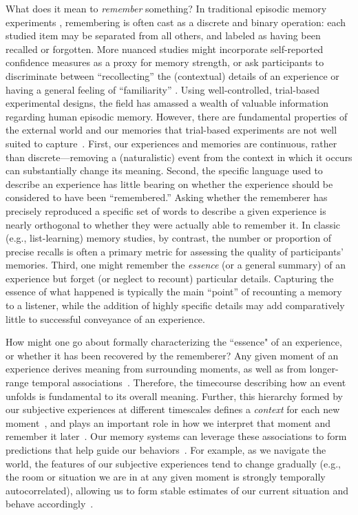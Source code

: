 \documentclass{article}
\begin{document}
What does it mean to \textit{remember} something? In traditional episodic memory experiments \citep[e.g., list-learning or trial-based experiments;][]{Murd62a, Kaha96}, remembering is often cast as a discrete and binary operation: each studied item may be separated from all others, and labeled as having been recalled or forgotten. More nuanced studies might incorporate self-reported confidence measures as a proxy for memory strength, or ask participants to discriminate between ``recollecting'' the (contextual) details of an experience or having a general feeling of ``familiarity'' \citep{Yone02}. Using well-controlled, trial-based experimental designs, the field has amassed a wealth of valuable information regarding human episodic memory.  However, there are fundamental properties of the external world and our memories that trial-based experiments are not well suited to capture~\citep[for review also see][]{KoriGold94, HukEtal18}.  First, our experiences and memories are continuous, rather than discrete---removing a (naturalistic) event from the context in which it occurs can substantially change its meaning.  Second, the specific language used to describe an experience has little bearing on whether the experience should be considered to have been ``remembered.''  Asking whether the rememberer has precisely reproduced a specific set of words to describe a given experience is nearly orthogonal to whether they were actually able to remember it.  In classic (e.g., list-learning) memory studies, by contrast, the number or proportion of precise recalls is often a primary metric for assessing the quality of participants' memories.  Third, one might remember the \textit{essence} (or a general summary) of an experience but forget (or neglect to recount) particular details.  Capturing the essence of what happened is typically the main ``point'' of recounting a memory to a listener, while the addition of highly specific details may add comparatively little to successful conveyance of an experience.

How might one go about formally characterizing the ``essence" of an experience, or whether it has been recovered by the rememberer?  Any given moment of an experience derives meaning from surrounding moments, as well as from longer-range temporal associations~\citep{LernEtal11, Mann19}.  Therefore, the timecourse describing how an event unfolds is fundamental to its overall meaning.  Further, this hierarchy formed by our subjective experiences at different timescales defines a \textit{context} for each new moment~\citep[e.g., ][]{HowaKaha02a, HowaEtal14}, and plays an important role in how we interpret that moment and remember it later~\citep[for review see][]{MannEtal15}.  Our memory systems can leverage these associations to form predictions that help guide our behaviors~\citep{RangRitc12}.  For example, as we navigate the world, the features of our subjective experiences tend to change gradually (e.g., the room or situation we are in at any given moment is strongly temporally autocorrelated), allowing us to form stable estimates of our current situation and behave accordingly~\citep{ZackEtal07, ZwaaRadv98}.
\end{document}
